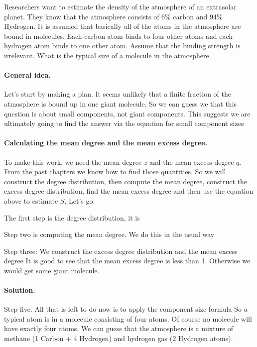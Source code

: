 Researchers want to estimate the density of the atmosphere of an extrasolar planet. They know that the atmosphere consists of 6\% carbon and 94\% Hydrogen. It is assumed that basically all of the atoms in the atmosphere are bound in molecules. Each carbon atom binds to four other atoms and each hydrogen atom binds to one other atom. Assume that the binding strength is irrelevant. What is the typical size of a molecule in the atmosphere.
\solution
\paragraph{General idea.}Let's start by making a plan. It seems unlikely that a finite fraction of the atmosphere is bound up in one giant molecule. So we can guess we that this question is about small components, not giant components. This suggests we are ultimately going to find the answer via the equation for small component sizes
\paragraph{Calculating the mean degree and the mean excess degree.}To make this work, we need the mean degree $z$ and the mean excess degree $q$. From the past chapters we know how to find those quantities. So we will construct the degree distribution, then compute the mean degree, construct the excess degree distribution, find the mean excess degree and then use the equation above to estimate $S$. Let's go.

The first step is the degree distribution, it is 

Step two is computing the mean degree. We do this in the usual way

Step three: We construct the excess degree distribution 
and the mean excess degree
It is good to see that the mean excess degree is less than 1. Otherwise we would get some giant molecule. 

\paragraph{Solution.}Step five. All that is left to do now is to apply the component size formula
So a typical atom is in a molecule consisting of four atoms. Of course no molecule will have exactly four atoms. We can guess that the atmosphere is a mixture of methane (1 Carbon + 4 Hydrogen) and hydrogen gas (2 Hydrogen atoms). 